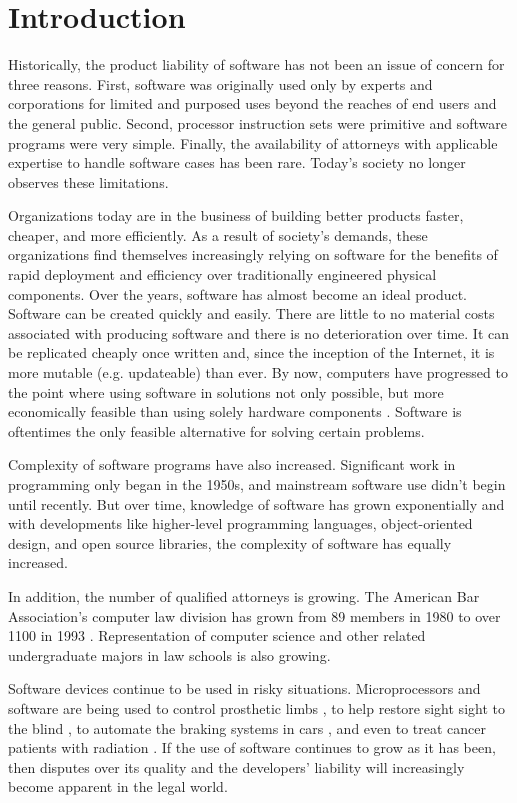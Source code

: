\chapter{Introduction}

Historically, the product liability of software has not been an issue of
concern for three reasons. First, software was originally used only by experts
and corporations for limited and purposed uses beyond the reaches of end
users and the general public. Second, processor instruction sets were primitive
and software programs were very simple. Finally, the availability of attorneys
with applicable expertise to handle software cases has been rare. Today's
society no longer observes these limitations.

Organizations today are in the business of building better products faster,
cheaper, and more efficiently. As a result of society's demands, these
organizations find themselves increasingly relying on software for the benefits
of rapid deployment and efficiency over traditionally engineered physical
components. Over the years, software has almost become an ideal product.
Software can be created quickly and easily. There are little to no material
costs associated with producing software and there is no deterioration over
time. It can be replicated cheaply once written and, since the inception of the
Internet, it is more mutable (e.g. updateable) than ever. By now, computers
have progressed to the point where using software in solutions not only
possible, but more economically feasible than using solely hardware components \cite{Baase97}.
Software is oftentimes the only feasible alternative for solving certain
problems.

Complexity of software programs have also increased. Significant work in
programming only began in the 1950s, and mainstream software use didn't begin
until recently. But over time, knowledge of software has grown exponentially
and with developments like higher-level programming languages, object-oriented
design, and open source libraries, the complexity of software has equally
increased.

In addition, the number of qualified attorneys is growing. The American Bar
Association's computer law division has grown from 89 members in 1980 to over
1100 in 1993 \cite{Armour93}. Representation of computer science and other related
undergraduate majors in law schools is also growing.

Software devices continue to be used in risky situations. Microprocessors and
software are being used to control prosthetic limbs \cite{Graupe78}, to help
restore sight sight to the blind \cite{Fox95}, to automate the braking systems
in cars \cite{Hurtig94}, and even to treat cancer patients with radiation
\cite{Leveson93}. If the use of software continues to grow as it has been, then
disputes over its quality and the developers' liability will increasingly become
apparent in the legal world.
